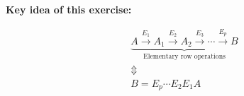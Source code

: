\noindent\textbf{Key idea of this exercise:}

$$
    \begin{gathered}
    \underbrace{
        A \xrightarrow{E_1} A_1
        \xrightarrow{E_2} A_2
        \xrightarrow{E_3} \cdots
        \xrightarrow{E_p} B
    }_{\text{Elementary row operations}}
    \\[0.75em]
    \Updownarrow
    \\[0.75em]
    \boxed{B=E_p\cdots E_2E_1A}
    \end{gathered}
$$